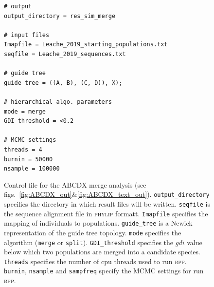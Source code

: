 \documentclass{article1}
\begin{document}
\begin{figure}[h]
	\footnotesize
    \begin{verbatim}
# output
output_directory = res_sim_merge

# input files
Imapfile = Leache_2019_starting_populations.txt
seqfile = Leache_2019_sequences.txt

# guide tree
guide_tree = ((A, B), (C, D)), X);

# hierarchical algo. parameters
mode = merge
GDI threshold = <0.2

# MCMC settings
threads = 4
burnin = 50000
nsample = 100000
\end{verbatim}

\caption{Control file for the ABCDX merge analysis (see
figs.~\ref{fig:ABCDX_out}\&\ref{fig:ABCDX_text_out}).  \texttt{output\_directory}
specifies the directory in which result files will be written.  \texttt{seqfile} is the
sequence alignment file in \textsc{phylip} formatt. \texttt{Imapfile} specifies the
mapping of individuals to populations. \texttt{guide\_tree} is a Newick representation of
the guide tree topology.  \texttt{mode} specifies the algorithm (\texttt{merge} or
\texttt{split}). \texttt{GDI\_threshold} specifies the $gdi$ value below which two
populations are merged into a candidate species.  \texttt{threads} specifies the number of
cpu threads used to run \textsc{bpp}.  \texttt{burnin}, \texttt{nsample} and
\texttt{sampfreq} specify the MCMC settings for run \textsc{bpp}. %
} \label{fig:ABCDX_mcf}
\end{figure}
\end{document}
